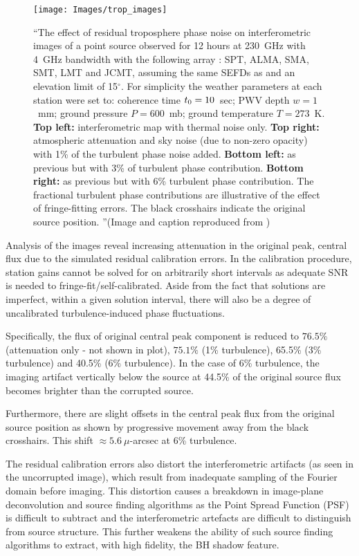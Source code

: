 \begin{figure}[h!]
\texttt{[image: Images/trop\_images]}
\caption{``The effect of residual troposphere phase noise on interferometric images of a point source observed for 12 hours at 230~GHz with 4~GHz bandwidth with the following array : SPT, ALMA, SMA, SMT, LMT and JCMT, assuming the same SEFDs as \protect\citet{Lu_2014} and an elevation limit of 15$^\circ$. For simplicity the weather parameters at each station were set to: coherence time $t_{\rm 0}=10$~sec; PWV depth $w=1$~mm; ground pressure $P=600$~mb; ground temperature $T =273$~K. {\bf Top left:} interferometric map with thermal noise only. {\bf Top right:} atmospheric attenuation and sky noise (due to non-zero opacity) with 1\% of the turbulent phase noise added. {\bf Bottom left:} as previous but with 3\% of turbulent phase contribution. {\bf Bottom right:} as previous but with 6\% turbulent phase contribution. The fractional turbulent phase contributions are illustrative of the effect of fringe-fitting errors. The black crosshairs indicate the original source position. ''(Image and caption reproduced from \citet{Blecher_2016}) \label{fig:trop_images}%
}
\end{figure}


Analysis of the images reveal increasing attenuation in the original peak, central flux due to the simulated residual calibration errors. In the calibration procedure, station gains cannot be solved for on arbitrarily short intervals as adequate SNR is needed to fringe-fit/self-calibrated. Aside from the fact that solutions are imperfect, within a given solution interval, there will also be a degree of uncalibrated turbulence-induced phase fluctuations.

Specifically, the flux of original central peak component is reduced to $76.5\%$ (attenuation only - not shown in plot), $75.1\%$ (1\% turbulence), 65.5\% (3\% turbulence) and  40.5\% (6\% turbulence). In the case of 6\% turbulence, the imaging artifact vertically below the source at 44.5\% of the original source flux becomes brighter than the corrupted source. 


Furthermore, there are slight offsets in the central peak flux from the original source position as shown by progressive movement away from the black crosshairs. This shift $\approx 5.6\ \mu$-arcsec at 6\% turbulence. 


The residual calibration errors also distort the interferometric artifacts (as seen in the uncorrupted image), which result from inadequate sampling of the Fourier domain before imaging. This distortion causes a breakdown in image-plane deconvolution and source finding algorithms as the Point Spread Function (PSF) is difficult to subtract and the interferometric artefacts are difficult to distinguish from source structure. This further weakens the ability of such source finding algorithms to extract, with high fidelity, the BH shadow feature.


